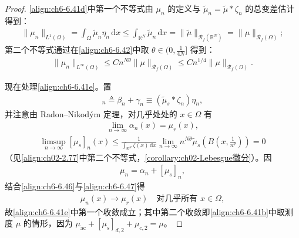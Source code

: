 \documentclass[../../main.tex]{subfiles}%
\begin{document}
\begin{proof}
\eqref{align:ch6-6.41d}中第一个不等式由 $\mu_n$ 的定义与 $\widetilde\mu_n=\widetilde\mu*\zeta_n$ 的总变差估计得到：
\begin{align*}
\|\mu_n\|_{L^1(\Omega)}=\int_\Omega\widetilde\mu_n\eta_n\,\mathrm{d}x\leqslant\int_{\mathbb{R}^N}\widetilde\mu_n\,\mathrm{d}x=\|\widetilde\mu\|_{\mathscr{R}_f(\mathbb{R}^N)}=\|\mu\|_{\mathscr{R}_f(\Omega)};
\end{align*}
第二个不等式通过在\eqref{align:ch6-6.42}中取 $\theta\in(0,\frac{1}{4N}]$ 得到：
\begin{align*}
\|\mu_n\|_{L^\infty(\Omega)}\leqslant Cn^{N\theta}\|\mu\|_{\mathscr{R}_f(\Omega)}
\leqslant Cn^{1/4}\|\mu\|_{\mathscr{R}_f(\Omega)}.
\end{align*}

现在处理\eqref{align:ch6-6.41e}。置
\begin{align}
[\mu_s]_n\triangleq\beta_n+\gamma_n\equiv(\widetilde\mu_s*\zeta_n)\eta_n, \label{align:ch6-6.45}
\end{align}
并注意由 Radon--Nikodým 定理，对几乎处处的 $x\in\Omega$ 有
\begin{align}
\lim_{n\to\infty}\alpha_n(x)=\mu_r(x), \label{align:ch6-6.46}
\end{align}
\begin{align}
\limsup_{n\to\infty}[\mu_s]_n(x)
\leqslant\frac{1}{\int_{\mathbb{R}^N}\zeta(x)\,\mathrm{d}x}
\lim_{n\to\infty}n^{N\theta}\widetilde\mu_s\left(B\left(x,\frac{1}{n^\theta}\right)\right)=0 \label{align:ch6-6.47}
\end{align}
（见\eqref{align:ch02-2.77}中第二个不等式，\cref{corollary:ch02-Lebesgue微分}）。因
\begin{align*}
\mu_n=\alpha_n+[\mu_s]_n,
\end{align*}
结合\eqref{align:ch6-6.46}与\eqref{align:ch6-6.47}得
\begin{align*}
\mu_n(x)\to\mu_r(x)\quad\text{对几乎所有 }x\in\Omega,
\end{align*}
故\eqref{align:ch6-6.41e}中第一个收敛成立；其中第二个收敛即\eqref{align:ch6-6.41b}中取测度 $\mu$ 的情形，因为 $\mu_{\mathrm{ac}}+[\mu_s]_{d,2}+\mu_{c,2}=\mu$。


\end{proof}
\end{document}
